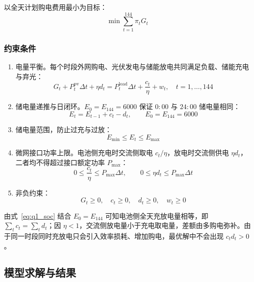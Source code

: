 以全天计划购电费用最小为目标：
\begin{equation}
\min \sum_{t=1}^{144}\pi_t G_t \label{eq:q1_obj}
\end{equation}

\subsubsection{约束条件}

\begin{enumerate}
  \item 电量平衡。每个时段外网购电、光伏发电与储能放电共同满足负载、储能充电与弃光：
  \begin{equation}
  G_t+P^{\mathrm{pv}}_t\Delta t+\eta d_t
  =P^{\mathrm{load}}_t\Delta t+\frac{c_t}{\eta}+w_t,\quad t=1,\dots,144 \label{eq:q1_balance}
  \end{equation}
  \item 储电量递推与日闭环。$E_0=E_{144}=6000$ 保证 $0{:}00$ 与 $24{:}00$ 储电量相同：
  \begin{equation}
  E_t=E_{t-1}+c_t-d_t,\qquad E_0=E_{144}=6000 \label{eq:q1_soc}
  \end{equation}
  \item 储电量范围，防止过充与过放：
  \begin{equation}
  E_{\min}\le E_t\le E_{\max} \label{eq:q1_soc_range}
  \end{equation}
  \item 微网接口功率上限。电池侧充电时交流侧取电 $c_t/\eta$，放电时交流侧供电 $\eta d_t$，二者均不得超过接口额定功率 $P_{\max}$：
  \begin{equation}
  0\le\frac{c_t}{\eta}\le P_{\max}\Delta t,\qquad
  0\le\eta d_t\le P_{\max}\Delta t \label{eq:q1_power}
  \end{equation}
  \item 非负约束：
  \begin{equation}
  G_t\ge 0,\quad c_t\ge 0,\quad d_t\ge 0,\quad w_t\ge 0 \label{eq:q1_nonneg}
  \end{equation}
\end{enumerate}

由式~\eqref{eq:q1_soc} 结合 $E_0=E_{144}$ 可知电池侧全天充放电量相等，即 $\sum_t c_t=\sum_t d_t$；因 $\eta<1$，交流侧放电量小于充电取电量，差额由多购电弥补。由于同一时段同时充放电只会引入效率损耗、增加购电，最优解中不会出现 $c_t d_t>0$。

\subsection{模型求解与结果}

